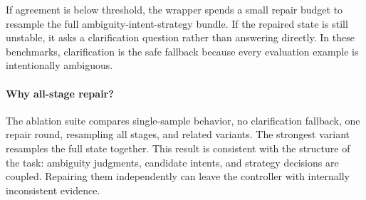 If agreement is below threshold, the wrapper spends a small repair budget to resample the full ambiguity-intent-strategy bundle. If the repaired state is still unstable, it asks a clarification question rather than answering directly. In these benchmarks, clarification is the safe fallback because every evaluation example is intentionally ambiguous.

\paragraph{Why all-stage repair?}
The ablation suite compares single-sample behavior, no clarification fallback, one repair round, resampling all stages, and related variants. The strongest variant resamples the full state together. This result is consistent with the structure of the task: ambiguity judgments, candidate intents, and strategy decisions are coupled. Repairing them independently can leave the controller with internally inconsistent evidence.
